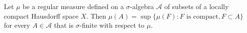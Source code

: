 Let $\mu$ be a regular measure defined on a $\sigma$-algebra $\mathcal{A}$ of subsets of a locally compact Hausdorff space $X$. Then $\mu(A) = \sup \{ \mu(F) : F \text{ is compact}, F \subset A \}$ for every $A \in \mathcal{A}$ that is $\sigma$-finite with respect to $\mu$.
